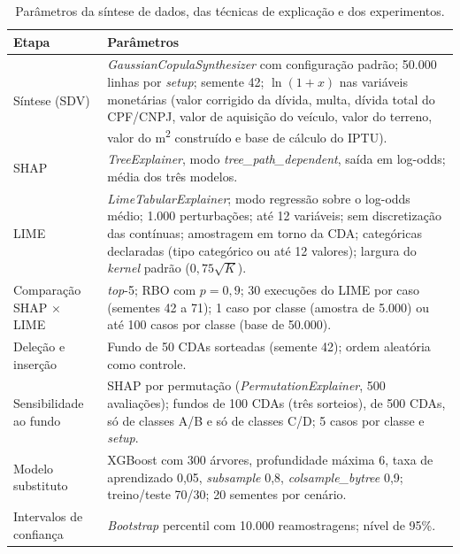 \begin{apendicesenv}
\begin{table}[H]
    \centering
    \caption[Parâmetros da síntese, das explicações e dos experimentos]{Parâmetros da síntese de dados, das técnicas de explicação e dos experimentos.}
    \label{tab:ap_parametros}
    \small
    \renewcommand{\arraystretch}{1.2}
    \begin{tabularx}{\textwidth}{>{\raggedright\arraybackslash}p{4.2cm}L}
        \toprule
        \textbf{Etapa} & \textbf{Parâmetros} \\
        \midrule
        Síntese (SDV) & \textit{GaussianCopulaSynthesizer} com configuração padrão; 50.000 linhas por \textit{setup}; semente 42; $\ln(1+x)$ nas variáveis monetárias (valor corrigido da dívida, multa, dívida total do CPF/CNPJ, valor de aquisição do veículo, valor do terreno, valor do m\textsuperscript{2} construído e base de cálculo do IPTU). \\
        SHAP & \textit{TreeExplainer}, modo \textit{tree\_path\_dependent}, saída em log-odds; média dos três modelos. \\
        LIME & \textit{LimeTabularExplainer}; modo regressão sobre o log-odds médio; 1.000 perturbações; até 12 variáveis; sem discretização das contínuas; amostragem em torno da CDA; categóricas declaradas (tipo categórico ou até 12 valores); largura do \textit{kernel} padrão ($0{,}75\sqrt{K}$). \\
        Comparação SHAP $\times$ LIME & \textit{top}-5; RBO com $p = 0{,}9$; 30 execuções do LIME por caso (sementes 42 a 71); 1 caso por classe (amostra de 5.000) ou até 100 casos por classe (base de 50.000). \\
        Deleção e inserção & Fundo de 50 CDAs sorteadas (semente 42); ordem aleatória como controle. \\
        Sensibilidade ao fundo & SHAP por permutação (\textit{PermutationExplainer}, 500 avaliações); fundos de 100 CDAs (três sorteios), de 500 CDAs, só de classes A/B e só de classes C/D; 5 casos por classe e \textit{setup}. \\
        Modelo substituto & XGBoost com 300 árvores, profundidade máxima 6, taxa de aprendizado 0,05, \textit{subsample} 0,8, \textit{colsample\_bytree} 0,9; treino/teste 70/30; 20 sementes por cenário. \\
        Intervalos de confiança & \textit{Bootstrap} percentil com 10.000 reamostragens; nível de 95\%. \\
        \bottomrule
    \end{tabularx}
\end{table}


\end{apendicesenv}
